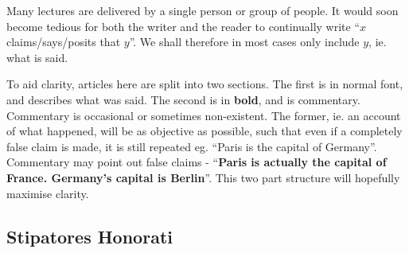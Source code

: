 
		Many lectures are delivered by a single person or group of people. It would soon become tedious for both the writer and the reader to continually write ``\(x\) claims/says/posits that \(y\)''. We shall therefore in most cases only include \(y\), ie. what is said.

		To aid clarity, articles here are split into two sections. The first is in normal font, and describes what was said. The second is in \textbf{bold}, and is commentary. Commentary is occasional or sometimes non-existent. The former, ie. an account of what happened, will be as objective as possible, such that even if a completely false claim is made, it is still repeated eg. ``Paris is the capital of Germany''. Commentary may point out false claims - ``\textbf{Paris is actually the capital of France. Germany's capital is Berlin}''. This two part structure will hopefully maximise clarity.



	\subsection{Stipatores Honorati}




